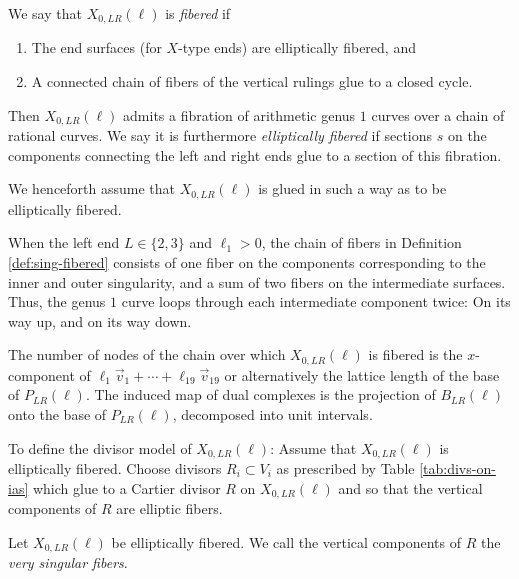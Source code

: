 \documentclass[table,x11names]{amsart}
\begin{document}
\begin{definition}\label{def:sing-fibered} We say that $X_{0,LR}(\ell)$ is {\it fibered} if
\begin{enumerate} 
\item The end surfaces (for $X$-type ends) are elliptically fibered, and
\item A connected chain of fibers of the vertical rulings
glue to a closed cycle.
\end{enumerate}
Then $X_{0,LR}(\ell)$ admits a fibration of arithmetic genus $1$ curves over
a chain of rational curves.
We say it is furthermore {\it elliptically fibered} if sections $s$
on the components connecting the left and right ends glue to
a section of this fibration.
\end{definition}

\begin{remark} We henceforth assume that $X_{0,LR}(\ell)$ is glued in such a way
as to be elliptically fibered.
\end{remark}

\begin{remark} When the left end $L\in \{2,3\}$ and $\ell_1>0$,
the chain of fibers in
Definition \ref{def:sing-fibered} consists of one fiber on the
components corresponding to the inner and outer singularity,
and a sum of two fibers on
the intermediate surfaces. Thus, the genus $1$ curve loops through each
intermediate component twice: On its way up, and on its way down. \end{remark}

The number of nodes of the chain over which $X_{0,LR}(\ell)$ is fibered
is the $x$-component of $\ell_1\vec{v}_1+\cdots + \ell_{19}\vec{v}_{19}$
or alternatively the lattice length of
the base of $P_{LR}(\ell)$. The induced map of dual complexes is the projection of
$B_{LR}(\ell)$ onto the base of $P_{LR}(\ell)$, decomposed into unit intervals.

\begin{definition}\label{divisordef} To define the divisor model of $X_{0,LR}(\ell)$:
Assume that $X_{0,LR}(\ell)$ is elliptically fibered.
Choose divisors $R_i\subset V_i$ as prescribed by Table \ref{tab:divs-on-ias}
which glue to a Cartier divisor $R$ on
$X_{0,LR}(\ell)$ and so that the vertical components of $R$
are elliptic fibers. \end{definition}

\begin{definition}\label{def:very-sing} Let $X_{0,LR}(\ell)$ be elliptically fibered. We call the
vertical components of $R$ the {\it very singular fibers}.  \end{definition}
\end{document}
